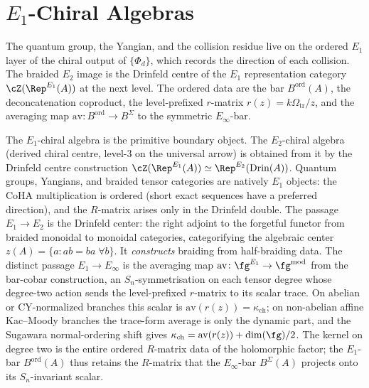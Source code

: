 \chapter{\texorpdfstring{$E_1$}{E-1}-Chiral Algebras}
\label{ch:e1-chiral}

The quantum group, the Yangian, and the collision residue live on the ordered $E_1$ layer of the chiral output of $\{\Phi_d\}$, which records the direction of each collision. The braided $E_2$ image is the Drinfeld centre of the $E_1$ representation category $\cZ(\Rep^{E_1}(A))$ at the next level. The ordered data are the bar $B^{\mathrm{ord}}(A)$, the deconcatenation coproduct, the level-prefixed $r$-matrix $r(z) = k\Omega_{\mathrm{tr}}/z$, and the averaging map $\mathrm{av}\colon B^{\mathrm{ord}} \to B^{\Sigma}$ to the symmetric $E_\infty$-bar.


\begin{remark}
\label{rem:e1-primacy-vol3}
The $E_1$-chiral algebra is the primitive boundary object.
The $E_2$-chiral algebra (derived chiral centre, level-$3$ on the
universal arrow) is obtained from it by the Drinfeld centre
construction $\cZ(\Rep^{E_1}(A)) \simeq \Rep^{E_2}(\mathrm{Drin}(A))$.
Quantum groups, Yangians, and braided tensor categories are natively $E_1$
objects: the CoHA multiplication is ordered (short exact sequences have a
preferred direction), and the $R$-matrix arises only in the Drinfeld double.
The passage $E_1 \to E_2$ is the Drinfeld center: the right adjoint
to the forgetful functor from braided monoidal to monoidal categories,
categorifying the algebraic center $z(A) = \{a : ab = ba\;\forall b\}$.
It \emph{constructs} braiding from half-braiding data.
The distinct passage $E_1 \to E_\infty$ is the averaging map
$\mathrm{av} \colon \fg^{E_1} \to \fg^{\mathrm{mod}}$
from the bar-cobar construction, an $S_n$-symmetrisation on each tensor degree whose
degree-two action sends the level-prefixed $r$-matrix to its scalar
trace. On abelian or CY-normalized branches this scalar is
$\mathrm{av}(r(z)) = \kappa_{\mathrm{ch}}$; on non-abelian affine
Kac--Moody branches the trace-form average is only the dynamic part,
and the Sugawara normal-ordering shift gives
$\kappa_{\mathrm{ch}}=\mathrm{av}(r(z))+\dim(\fg)/2$.
The kernel on degree
two is the entire ordered $R$-matrix data of the holomorphic factor;
the $E_1$-bar $B^{\mathrm{ord}}(A)$ thus retains the $R$-matrix that
the $E_\infty$-bar $B^{\Sigma}(A)$ projects onto its $S_n$-invariant
scalar.
\end{remark}

